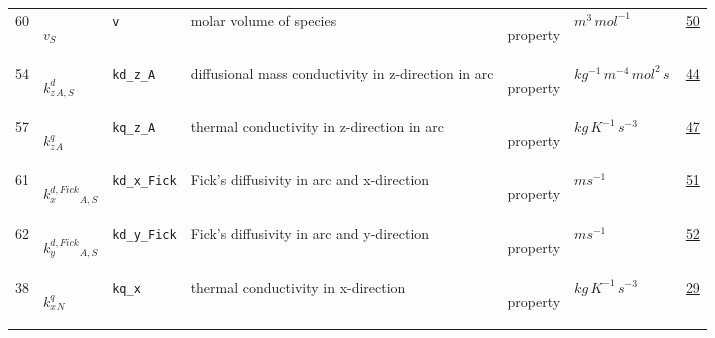 \begin{longtable}{|p{1cm}|p{2.5cm}|p{4.5cm}|p{8cm}|p{3.0cm}|p{3cm}|p{1cm}|}
                 \\
            60
             & \hypertarget{"v:60"}{ $ {v}{_{S}} $}
             & \verb|v|
             & molar volume of species
             & \begin{lay}property \end{lay}
             & $ m^{3} \,mol^{-1} \, $
             &                 \hyperlink{"e:50"}{ 50 }
                 \\
            54
             & \hypertarget{"v:54"}{ $ {{k^d_z}}{_{A, S}} $}
             & \verb|kd_z_A|
             & diffusional mass conductivity in z-direction in arc
             & \begin{lay}property \end{lay}
             & $ kg^{-1} \,m^{-4} \,mol^{2} \,s \, $
             &                 \hyperlink{"e:44"}{ 44 }
                 \\
            57
             & \hypertarget{"v:57"}{ $ {{k^q_z}}{_{A}} $}
             & \verb|kq_z_A|
             & thermal conductivity in z-direction in arc
             & \begin{lay}property \end{lay}
             & $ kg \,K^{-1} \,s^{-3} \, $
             &                 \hyperlink{"e:47"}{ 47 }
                 \\
            61
             & \hypertarget{"v:61"}{ $ {{k^{d,Fick}_x}}{_{A, S}} $}
             & \verb|kd_x_Fick|
             & Fick's diffusivity in arc and x-direction 
             & \begin{lay}property \end{lay}
             & $ m s^{-1} \, $
             &                 \hyperlink{"e:51"}{ 51 }
                 \\
            62
             & \hypertarget{"v:62"}{ $ {{k^{d,Fick}_y}}{_{A, S}} $}
             & \verb|kd_y_Fick|
             & Fick's diffusivity in arc and y-direction 
             & \begin{lay}property \end{lay}
             & $ m s^{-1} \, $
             &                 \hyperlink{"e:52"}{ 52 }
                 \\
            38
             & \hypertarget{"v:38"}{ $ {{k^q_x}}{_{N}} $}
             & \verb|kq_x|
             & thermal conductivity in x-direction
             & \begin{lay}property \end{lay}
             & $ kg \,K^{-1} \,s^{-3} \, $
             &                 \hyperlink{"e:29"}{ 29 }

\end{longtable}
